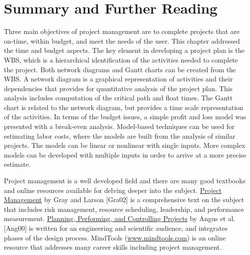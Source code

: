 \section{Summary and Further Reading}
\label{section:summary-and-further-reading}

Three main objectives of project management are to complete projects
that are on-time, within budget, and meet the needs of the user. This
chapter addressed the time and budget aspects. The key element in
developing a project plan is the WBS, which is a hierarchical
identification of the activities needed to complete the project. Both
network diagrams and Gantt charts can be created from the WBS. A network
diagram is a graphical representation of activities and their
dependencies that provides for quantitative analysis of the project
plan. This analysis includes computation of the critical path and float
times. The Gantt chart is related to the network diagram, but provides a
time scale representation of the activities. In terms of the budget
issues, a simple profit and loss model was presented with a break-even
analysis. Model-based techniques can be used for estimating labor costs,
where the models are built from the analysis of similar projects. The
models can be linear or nonlinear with single inputs. More complex
models can be developed with multiple inputs in order to arrive at a
more precise estimate.

Project management is a well developed field and there are many good
textbooks and online resources available for delving deeper into the
subject. \ul{Project Management} by Gray and Larson {[}Gra02{]} is a
comprehensive text on the subject that includes risk management,
resource scheduling, leadership, and performance measurement.
\ul{Planning, Performing, and Controlling Projects} by Angus et al.
{[}Ang00{]} is written for an engineering and scientific audience, and
integrates phases of the design process. MindTools
(\href{http://www.mindtools.com}{www.mindtools.com}) is an online
resource that addresses many career skills including project management.
